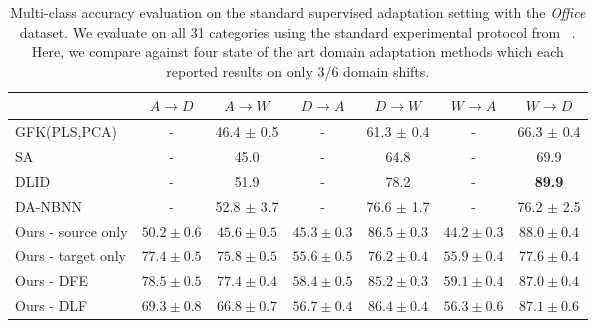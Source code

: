 \begin{table*}
  \setlength{\tabcolsep}{4pt}
  \small
\centering
\begin{tabular}{lcccccc}
\toprule
                     & $A \rightarrow D$   & $A \rightarrow W$   & $D \rightarrow A$   & $D \rightarrow W$   & $W \rightarrow A$   & $W \rightarrow D$   \\
\midrule
GFK(PLS,PCA)~\cite{gong-cvpr12} & - & 46.4 $\pm$ 0.5 & - & 61.3 $\pm$ 0.4 & - & 66.3 $\pm$ 0.4\\
SA~\cite{fernando-iccv13} & - & 45.0 & - & 64.8 & - & 69.9\\
DLID~\cite{ref:dlid} & - & 51.9 & - & 78.2 & - & \bf{89.9}\\     
DA-NBNN~\cite{da-nbnn} & - & 52.8 $\pm$ 3.7 & - & 76.6 $\pm$ 1.7 &           - & 76.2 $\pm$ 2.5\\
\midrule
 Ours - source only   & $50.2 \pm 0.6$     & $45.6 \pm 0.5$     & $45.3 \pm 0.3$     & $\bm{86.5 \pm 0.3}$     & $44.2 \pm 0.3$     & $88.0 \pm 0.4$     \\
 Ours - target only   & $77.4 \pm 0.5$     & $75.8 \pm 0.5$     & $55.6 \pm 0.5$     & $76.2 \pm 0.4$     & $55.9 \pm 0.4$     & $77.6 \pm 0.4$     \\
Ours - DFE & $\bm{78.5 \pm 0.5}$     & $\bm{77.4 \pm 0.4}$     & $\bm{58.4 \pm 0.5}$     & $85.2 \pm 0.3$     & $\bm{59.1 \pm 0.4}$     & $87.0 \pm 0.4$     \\
Ours - DLF& $69.3 \pm 0.8$ & $66.8 \pm 0.7$ & $56.7 \pm 0.4$ & $86.4 \pm 0.4$ & $56.3 \pm 0.6$ & $87.1 \pm 0.6$ \\
\bottomrule
\end{tabular}

\caption{Multi-class accuracy evaluation on the standard supervised adaptation setting with the \emph{Office} dataset. We evaluate on all 31 categories using the standard experimental protocol from ~\cite{saenko-eccv10}. Here, we compare against four state of the art domain adaptation methods which each reported results on only 3/6 domain shifts. }
\label{table:full-semi}
\end{table*}

